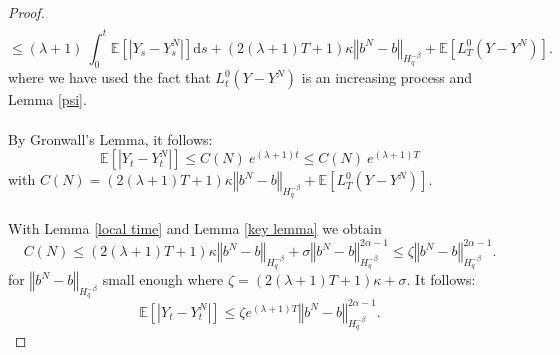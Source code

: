 \documentclass[11pt]{enstaPRE}
\newcommand{\norme}[1]{\left\Vert #1\right\Vert}
\newcommand{\E}{\mathbb{E}}
\newcommand{\di}{\mathrm{d}}
\begin{document}
\begin{proof}
\begin{multline*}
    \end{multline*}    
    \begin{equation*}
    \leq (\lambda + 1)\ \int_0^t\E\left[\left|Y_s-Y_s^N\right|\right] \di s + (2(\lambda + 1)T+1)\kappa\norme{b^N-b}_{H^{-\beta}_{q}}  + \E \left[L_T^0(Y-Y^N)\right].
    \end{equation*}
    where we have used the fact that $L_t^0(Y-Y^N)$ is an increasing process and Lemma \ref{psi}.    
    \paragraph{}
    By Gronwall's Lemma, it follows:
    \begin{equation}\label{gronwall}
    \E\left[\left|Y_t-Y_t^N\right|\right] \leq C(N)\ e^{(\lambda + 1)t}\leq C(N)\ e^{(\lambda + 1)T}
    \end{equation}
    with $C(N) = (2(\lambda + 1)T+1)\kappa\norme{b^N-b}_{H^{-\beta}_{q}}  + \E \left[L_T^0(Y-Y^N)\right].$      
    
    \paragraph{}
    With Lemma \ref{local time} and Lemma \ref{key lemma} we obtain \begin{equation*}
    C(N) \leq (2(\lambda + 1)T+1)\kappa\norme{b^N-b}_{H^{-\beta}_{q}}   + \sigma\norme{b^N-b}_{H^{-\beta}_{q}}^{2\alpha-1} \leq \zeta \norme{b^N-b}_{H^{-\beta}_{q}}^{2\alpha-1}.
    \end{equation*}   
    for $\norme{b^N-b}_{H^{-\beta}_{q}}$ small enough where $\zeta = (2(\lambda + 1)T+1)\kappa + \sigma $. It follows:
    \begin{equation}\label{gronfinal}
    \E\left[\left|Y_t-Y_t^N\right|\right] \leq \zeta e^{(\lambda + 1)T} \norme{b^N-b}_{H^{-\beta}_{q}}^{2\alpha-1}.
    \end{equation}
    

\end{proof}
\end{document}
